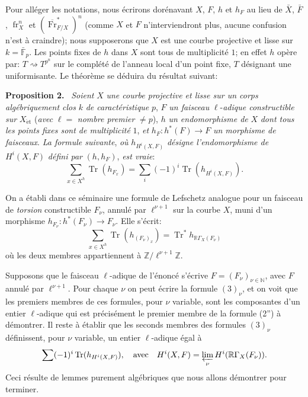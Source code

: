\documentclass[11pt]{article}
\newenvironment{statement}[1]{\par\medskip\noindent\textbf{#1.}\ }{\par\medskip}
\newcommand{\R}{\mathbb{R}}\newcommand{\RHomCore}{\mathbb{R}\mathrm{Hom}}
\providecommand{\et}{\mathrm{\acute{e}t}}
\providecommand{\Tr}{\operatorname{Tr}}
\providecommand{\Tr}{\operatorname{Tr}}
\providecommand{\Tr}{\operatorname{Tr}}
\providecommand{\R}{\mathrm R}
\providecommand{\Tr}{\operatorname{Tr}}
\providecommand{\Tr}{\operatorname{Tr}}
\providecommand{\fr}{\operatorname{fr}}
\providecommand{\Fr}{\operatorname{Fr}}
\providecommand{\Fr}{\operatorname{Fr}}
\providecommand{\fr}{\operatorname{fr}}
\providecommand{\et}{\acute{e}t}
\begin{document}
Pour alléger les notations, nous écrirons dorénavant $X$, $F$, $h$ et $h_F$ au lieu de $\bar X$, $\bar F$, $\fr_X^n$ et $(\overline{\Fr}^*_{F/X})^n$ (comme $X$ et $F$ n'interviendront plus, aucune confusion n'est à craindre); nous supposerons que $X$ est une courbe projective et lisse sur $k=\bar{\mathbb F}_p$. Les points fixes de $h$ dans $X$ sont tous de multiplicité $1$; en effet $h$ opère par: $T\rightsquigarrow T^{p^n}$ sur le complété de l'anneau local d'un point fixe, $T$ désignant une uniformisante. Le théorème se déduira du résultat suivant:

\begin{statement}{Proposition 2}
\emph{Soient} $X$ \emph{une courbe projective et lisse sur un corps algébriquement clos} $k$ \emph{de caractéristique} $p$, $F$ \emph{un faisceau}
$\ell$-\emph{adique constructible sur} $X_{\et}$ (\emph{avec} $\ell=$ \emph{nombre premier} $\ne p$), $h$ \emph{un endomorphisme de} $X$ \emph{dont tous les points fixes sont de multiplicité} $1$, \emph{et} $h_F:h^*(F)\to F$ \emph{un morphisme de faisceaux}. \emph{La formule suivante}, \emph{où} $h_{H^i(X,F)}$ \emph{désigne l'endomorphisme de} $H^i(X,F)$ \emph{défini par} $(h,h_F)$, \emph{est vraie}:
\[
\sum_{x\in X^h}\Tr(h_{F_x})=\sum_i(-1)^i\Tr(h_{H^i(X,F)}).
\tag{2''}
\]
\end{statement}

On a établi dans ce séminaire une formule de Lefschetz analogue pour un faisceau de \emph{torsion} constructible $F_\nu$, annulé par $\ell^{\nu+1}$ sur la courbe $X$, muni d'un morphisme $h_{F_\nu}:h^*(F_\nu)\to F_\nu$. Elle s'écrit:
\[
\sum_{x\in X^h}\Tr(h_{(F_\nu)_x})=\Tr^*h_{\R\Gamma_X(F_\nu)}
\tag{3}
\]
où les deux membres appartiennent à $\mathbb Z/\ell^{\nu+1}\mathbb Z$.

Supposons que le faisceau $\ell$-adique de l'énoncé s'écrive $F=(F_\nu)_{\nu\in\mathbb N}$, avec $F$ annulé par $\ell^{\nu+1}$. Pour chaque $\nu$ on peut écrire la formule $(3)_\nu$, et on voit que les premiers membres de ces formules, pour $\nu$ variable, sont les composantes d'un entier $\ell$-adique qui est précisément le premier membre de la formule (2'') à démontrer. Il reste à établir que les seconds membres des formules $(3)_\nu$ définissent, pour $\nu$ variable, un entier $\ell$-adique égal à
\[
\sum(-1)^i\Tr(h_{H^i(X,F)}),
\quad\text{avec}\quad
H^i(X,F)=\varprojlim_\nu H^i(\R\Gamma_X(F_\nu)).
\]
Ceci résulte de lemmes purement algébriques que nous allons démontrer pour terminer.
\end{document}
